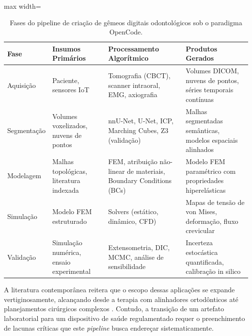 \begin{table}[htb]
\centering
\caption{Fases do pipeline de criação de gêmeos digitais odontológicos sob o paradigma OpenCode.}
\label{tab:pipeline-fases}
\begin{adjustbox}{max width=\textwidth}
\begin{tabular}{lp{3.2cm}p{3.2cm}p{3.2cm}}
\toprule
\textbf{Fase} & \textbf{Insumos Primários} & \textbf{Processamento Algorítmico} & \textbf{Produtos Gerados} \\
\midrule
Aquisição & Paciente, sensores IoT & Tomografia (CBCT), scanner intraoral, EMG, axiografia & Volumes DICOM, nuvens de pontos, séries temporais contínuas \\
Segmentação & Volumes voxelizados, nuvens de pontos & nnU-Net, U-Net, ICP, Marching Cubes, Z3 (validação) & Malhas segmentadas semânticas, modelos espaciais alinhados \\
Modelagem & Malhas topológicas, literatura indexada & FEM, atribuição não-linear de materiais, Boundary Conditions (BCs) & Modelo FEM paramétrico com propriedades hiperelásticas \\
Simulação & Modelo FEM estruturado & Solvers (estático, dinâmico, CFD) & Mapas de tensão de von Mises, deformação, fluxo crevicular \\
Validação & Simulação numérica, ensaio experimental & Extensometria, DIC, MCMC, análise de sensibilidade & Incerteza estocástica quantificada, calibração in silico \\
\bottomrule
\end{tabular}
\end{adjustbox}
\end{table}

A literatura contemporânea reitera que o escopo dessas aplicações se expande vertiginosamente, alcançando desde a terapia com alinhadores ortodônticos até planejamentos cirúrgicos complexos \cite{roy2025editorial}. Contudo, a transição de um artefato laboratorial para um dispositivo de saúde regulamentado requer o preenchimento de lacunas críticas que este \textit{pipeline} busca endereçar sistematicamente.

